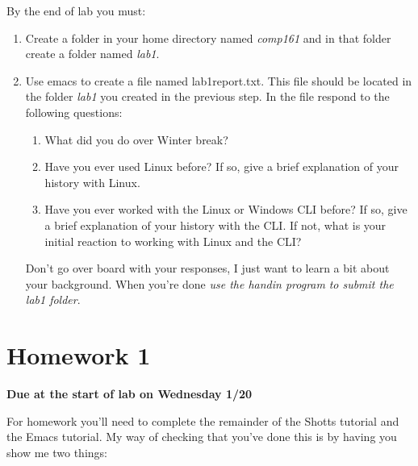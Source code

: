 \documentclass[]{tufte-handout}
\begin{document}
By the end of lab you must: 
\begin{enumerate}
\item Create a folder in your home directory named \textit{comp161} and in that folder create a folder named \textit{lab1}.
\item Use emacs to create a file named lab1report.txt. This file should be located in the folder \textit{lab1} you created in the previous step. In the file respond to the following questions:
\begin{enumerate}
\item What did you do over Winter break?
\item Have you ever used Linux before? If so, give a brief explanation of your history with Linux.
\item Have you ever worked with the Linux or Windows CLI before? If so, give a brief explanation of your history with the CLI. If not, what is your initial reaction to working with Linux and the CLI?
\end{enumerate}
Don't go over board with your responses, I just want to learn a bit about your background. When you're done \textit{use the \textit{handin} program}\textit{ to submit the lab1 folder}.   
\end{enumerate}

\section{Homework 1}

\begin{center}
\textbf{Due at the start of lab on Wednesday 1/20}
\end{center}

For homework you'll need to complete the remainder of the Shotts tutorial and the Emacs tutorial.  My way of checking that you've done this is by having you show me two things:
\end{document}
